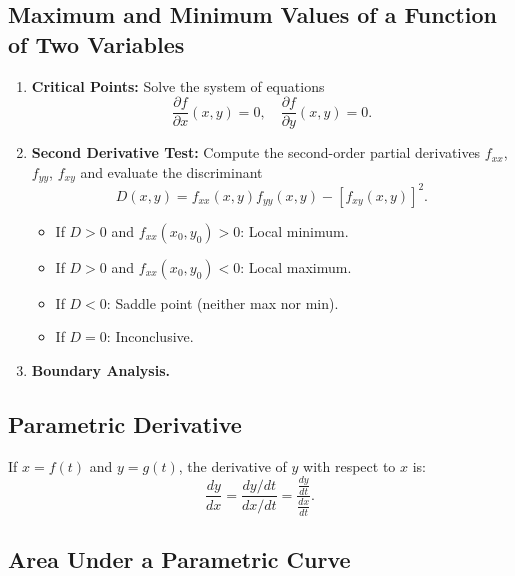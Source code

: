 \documentclass[a4paper,11pt]{article}
\begin{document}


\subsection{Maximum and Minimum Values of a Function of Two Variables}

\begin{tcolorbox}
    \begin{enumerate}
        \item \textbf{Critical Points:} Solve the system of equations
        \[
        \frac{\partial f}{\partial x} (x,y) = 0, \quad \frac{\partial f}{\partial y} (x,y) = 0. 
        \]
        \item \textbf{Second Derivative Test:} Compute the second-order partial derivatives $f_{xx}$, $f_{yy}$, $f_{xy}$ and evaluate the discriminant
        \[
        D(x,y) = f_{xx}(x,y)f_{yy}(x,y) - [f_{xy}(x,y)]^2.
        \]
        \begin{itemize}
            \item If $D>0$ and $f_{xx}(x_0,y_0)>0$: Local minimum.
            \item If $D>0$ and $f_{xx}(x_0,y_0)<0$: Local maximum.
            \item If $D<0$: Saddle point (neither max nor min).
            \item If $D=0$: Inconclusive.
        \end{itemize}
        \item \textbf{Boundary Analysis.}
    \end{enumerate}
\end{tcolorbox}




\subsection{Parametric Derivative}

\begin{tcolorbox}
    If $x=f(t)$ and $y=g(t)$, the derivative of $y$ with respect to $x$ is:
    \[
    \frac{dy}{dx} = \frac{dy/dt}{dx/dt} = \frac{\frac{dy}{dt}}{\frac{dx}{dt}}.
    \]
\end{tcolorbox}




\subsection{Area Under a Parametric Curve}
\end{document}
